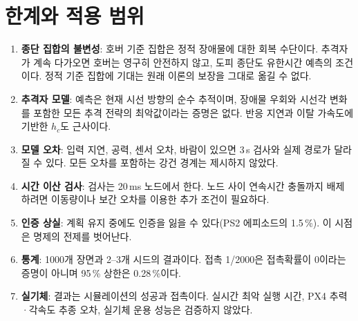 \documentclass[10pt,a4paper]{article}
\begin{document}
\section{한계와 적용 범위}\label{sec:limits}
\begin{enumerate}
\item \textbf{종단 집합의 불변성}: 호버 기준 집합은 정적 장애물에 대한 회복 수단이다. 추격자가 계속 다가오면 호버는 영구히 안전하지 않고, 도피 종단도 유한시간 예측의 조건이다. 정적 기준 집합에 기대는 원래 이론의 보장을 그대로 옮길 수 없다.
\item \textbf{추격자 모델}: 예측은 현재 시선 방향의 순수 추적이며, 장애물 우회와 시선각 변화를 포함한 모든 추격 전략의 최악값이라는 증명은 없다. 반응 지연과 이탈 가속도에 기반한 $h_c$도 근사이다.
\item \textbf{모델 오차}: 입력 지연, 공력, 센서 오차, 바람이 있으면 3\,s 검사와 실제 경로가 달라질 수 있다. 모든 오차를 포함하는 강건 경계는 제시하지 않았다.
\item \textbf{시간 이산 검사}: 검사는 20\,ms 노드에서 한다. 노드 사이 연속시간 충돌까지 배제하려면 이동량이나 보간 오차를 이용한 추가 조건이 필요하다.
\item \textbf{인증 상실}: 계획 유지 중에도 인증을 잃을 수 있다(PS2 에피소드의 1.5\,\%). 이 시점은 명제의 전제를 벗어난다.
\item \textbf{통계}: 1000개 장면과 2--3개 시드의 결과이다. 접촉 1/2000은 접촉확률이 0이라는 증명이 아니며 95\,\% 상한은 0.28\,\%이다.
\item \textbf{실기체}: 결과는 시뮬레이션의 성공과 접촉이다. 실시간 최악 실행 시간, PX4 추력·각속도 추종 오차, 실기체 운용 성능은 검증하지 않았다.
\end{enumerate}

\appendix
\end{document}
